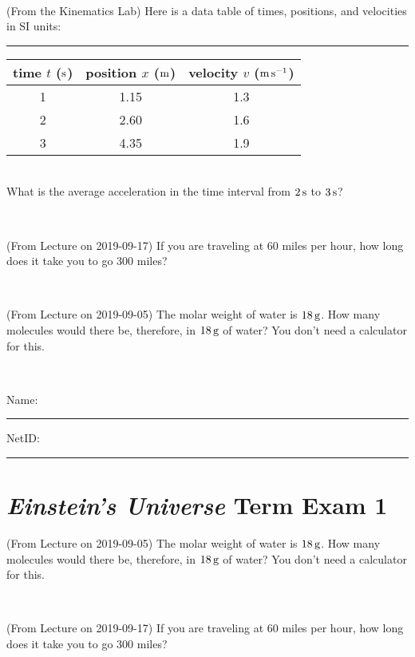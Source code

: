 \documentclass[12pt, letterpaper]{article}
\begin{document}
\vfill ~

\begin{problem} (From the Kinematics Lab)
Here is a data table of times, positions, and velocities in SI units:\\
\rule{1.0in}{0pt}\begin{tabular}{c|c|c}
time $t$ ($\mathrm{s}$) & position $x$ ($\mathrm{m}$) & velocity $v$ ($\mathrm{m}\,\mathrm{s}^{-1}$) \\
\hline
1 & 1.15 & 1.3 \\
2 & 2.60 & 1.6 \\
3 & 4.35 & 1.9 \\
\hline
\end{tabular}\\
What is the average acceleration in the time interval from $2\,\mathrm{s}$ to $3\,\mathrm{s}$?
\end{problem}


\vfill ~

\begin{problem} (From Lecture on 2019-09-17)
If you are traveling at 60 miles per hour, how long does
it take you to go 300 miles?
\end{problem}


\vfill ~

\begin{problem} (From Lecture on 2019-09-05)
The molar weight of water is $18\,\mathrm{g}$. How many molecules would there
be, therefore, in $18\,\mathrm{g}$ of water? You don't need a calculator for
this.
\end{problem}


\vfill ~


\cleardoublepage



\noindent
Name: \rule[-1ex]{0.60\textwidth}{0.1pt}
NetID: \rule[-1ex]{0.20\textwidth}{0.1pt}

\section*{\textsl{Einstein's Universe} Term Exam 1}
\setcounter{problem}{1}


\begin{problem} (From Lecture on 2019-09-05)
The molar weight of water is $18\,\mathrm{g}$. How many molecules would there
be, therefore, in $18\,\mathrm{g}$ of water? You don't need a calculator for
this.
\end{problem}


\vfill ~

\begin{problem} (From Lecture on 2019-09-17)
If you are traveling at 60 miles per hour, how long does
it take you to go 300 miles?
\end{problem}
\end{document}
